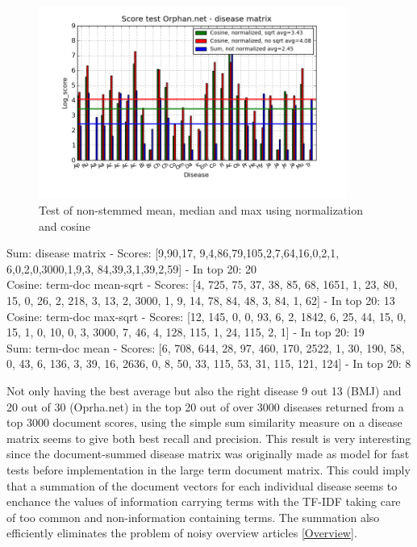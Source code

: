 \begin{figure}[h!]
        \begin{center}
          \includegraphics[width=0.9\textwidth]{barcharts/diseaseMatrix_orphan_hist_NOTnorm_3000_s_cos_sqrt_cos_sum_nn.png}
        \end{center}
        \caption{Test of non-stemmed mean, median and max using normalization and cosine}
        \label{termDoc_orphan_hist_3000_sum_dm_mea_cos_sqrt_td_max_cos_sqrt_td_mea_sum_nn_td}
\end{figure}

Sum: disease matrix - Scores: [9,90,17, 9,4,86,79,105,2,7,64,16,0,2,1, 6,0,2,0,3000,1,9,3, 84,39,3,1,39,2,59] - In top 20: 20 \\
Cosine: term-doc mean-sqrt - Scores: [4, 725, 75, 37, 38, 85, 68, 1651, 1, 23, 80, 15, 0, 26, 2, 218, 3, 13, 2, 3000, 1, 9, 14, 78, 84, 48, 3, 84, 1, 62] - In top 20: 13 \\
Cosine: term-doc max-sqrt - Scores: [12, 145, 0, 0, 93, 6, 2, 1842, 6, 25, 44, 15, 0, 15, 1, 0, 10, 0, 3, 3000, 7, 46, 4, 128, 115, 1, 24, 115, 2, 1] - In top 20: 19 \\
Sum: term-doc mean - Scores: [6, 708, 644, 28, 97, 460, 170, 2522, 1, 30, 190, 58, 0, 43, 6, 136, 3, 39, 16, 2636, 0, 8, 50, 33, 115, 53, 31, 115, 121, 124] - In top 20: 8

Not only having the best average but also the right disease 9 out 13 (BMJ) and 20 out of 30 (Oprha.net) in the top 20 out of over 3000 diseases returned from a top 3000 document scores, using the simple sum similarity measure on a disease matrix seems to give both best recall and precision. This result is very interesting since the document-summed disease matrix was originally made as model for fast tests before implementation in the large term document matrix. This could imply that a summation of the document vectors for each individual disease seems to enchance the values of information carrying terms with the TF-IDF taking care of too common and non-information containing terms. The summation also efficiently eliminates the problem of noisy overview articles \ref{Overview}. \\

